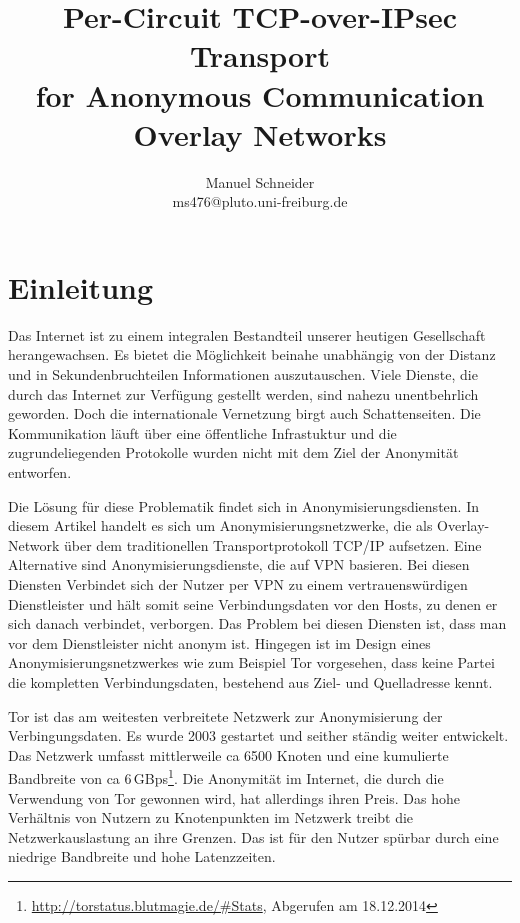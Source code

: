 \documentclass[fleqn,envcountsame,runningheads,10pt,a4paper]{llncs}
\begin{document}
\title{Per-Circuit TCP-over-IPsec Transport \\ for Anonymous Communication Overlay Networks} 
\author{Manuel Schneider \\ ms476@pluto.uni-freiburg.de}
\maketitle
\section{Einleitung}
\label{sec:intro}

Das Internet ist zu einem integralen Bestandteil unserer heutigen Gesellschaft 
herangewachsen. Es bietet die Möglichkeit beinahe unabhängig von der Distanz und 
in Sekundenbruchteilen Informationen auszutauschen. Viele Dienste, die durch das 
Internet zur Verfügung gestellt werden, sind nahezu unentbehrlich geworden. Doch 
die internationale Vernetzung birgt auch Schattenseiten. Die Kommunikation läuft 
über eine öffentliche Infrastuktur und die zugrundeliegenden Protokolle wurden 
nicht mit dem Ziel der Anonymität entworfen.

Die Lösung für diese Problematik findet sich in Anonymisierungsdiensten. In 
diesem Artikel handelt es sich um Anonymisierungsnetzwerke, die als 
Overlay-Network über dem traditionellen Transportprotokoll TCP/IP aufsetzen. 
Eine Alternative sind Anonymisierungsdienste, die auf VPN basieren. Bei diesen 
Diensten Verbindet sich der Nutzer per VPN zu einem vertrauenswürdigen 
Dienstleister und hält somit seine Verbindungsdaten vor den Hosts, zu denen er 
sich danach verbindet, verborgen. Das Problem bei diesen Diensten ist, dass man 
vor dem Dienstleister nicht anonym ist. Hingegen ist im Design eines 
Anonymisierungsnetzwerkes wie zum Beispiel Tor vorgesehen, dass keine 
Partei die kompletten Verbindungsdaten, bestehend aus Ziel- und Quelladresse 
kennt.

Tor ist das am weitesten verbreitete Netzwerk zur Anonymisierung der 
Verbingungsdaten. Es wurde 2003 gestartet und seither ständig weiter entwickelt. 
Das Netzwerk umfasst mittlerweile ca 6500 Knoten und eine kumulierte Bandbreite 
von ca 6\,GBps\footnote{\url{http://torstatus.blutmagie.de/\#Stats}, Abgerufen 
am 18.12.2014}.  Die Anonymität im Internet, die durch die Verwendung von 
Tor gewonnen wird, hat allerdings ihren Preis. Das hohe Verhältnis von 
Nutzern zu Knotenpunkten im Netzwerk treibt die Netzwerkauslastung an ihre 
Grenzen. Das ist für den Nutzer spürbar durch eine niedrige Bandbreite und hohe 
Latenzzeiten.
\end{document}
